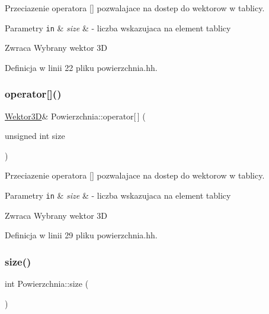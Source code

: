 Przeciazenie operatora \mbox{[}\mbox{]} pozwalajace na dostep do wektorow w tablicy. 


\begin{DoxyParams}[1]{Parametry}
\mbox{\tt in}  & {\em size} & -\/ liczba wskazujaca na element tablicy \\
\hline
\end{DoxyParams}
\begin{DoxyReturn}{Zwraca}
Wybrany wektor 3D 
\end{DoxyReturn}


Definicja w linii 22 pliku powierzchnia.\+hh.

\mbox{\label{class_powierzchnia_a8d69764400f092f37d3a401bf4875c34}} 
\subsubsection{\texorpdfstring{operator[]()}{operator[]()}\hspace{0.1cm}{\footnotesize\ttfamily [2/2]}}
{\footnotesize\ttfamily \hyperlink{class_wektor3_d}{Wektor3D}\& Powierzchnia\+::operator\mbox{[}$\,$\mbox{]} (\begin{DoxyParamCaption}\item[{unsigned int}]{size }\end{DoxyParamCaption})\hspace{0.3cm}{\ttfamily [inline]}}



Przeciazenie operatora \mbox{[}\mbox{]} pozwalajace na dostep do wektorow w tablicy. 


\begin{DoxyParams}[1]{Parametry}
\mbox{\tt in}  & {\em size} & -\/ liczba wskazujaca na element tablicy \\
\hline
\end{DoxyParams}
\begin{DoxyReturn}{Zwraca}
Wybrany wektor 3D 
\end{DoxyReturn}


Definicja w linii 29 pliku powierzchnia.\+hh.

\mbox{\label{class_powierzchnia_a9ec2cb128f77750a89995e8065fee3c4}} 
\subsubsection{\texorpdfstring{size()}{size()}\hspace{0.1cm}{\footnotesize\ttfamily [1/2]}}
{\footnotesize\ttfamily int Powierzchnia\+::size (\begin{DoxyParamCaption}{ }\end{DoxyParamCaption})\hspace{0.3cm}{\ttfamily [inline]}}



